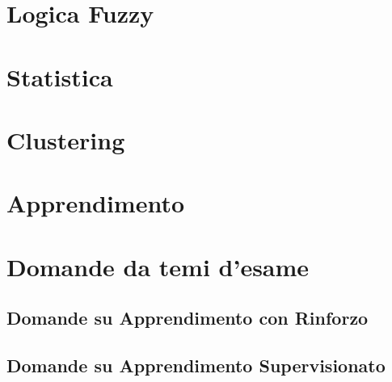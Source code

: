 \providecommand{\main}{.}


\newcommand{\graffe}[1]{\left\lbrace #1 \right\rbrace}

\setcounter{tocdepth}{2}






{\hypersetup{hidelinks}
  \tableofcontents  %
}

\chapter{Logica Fuzzy}


\chapter{Statistica}


\chapter{Clustering}


\chapter{Apprendimento}


\appendix
\chapter{Domande da temi d'esame}


\clearpage

\clearpage

\clearpage
\section{Domande su Apprendimento con Rinforzo}


\section{Domande su Apprendimento Supervisionato}


